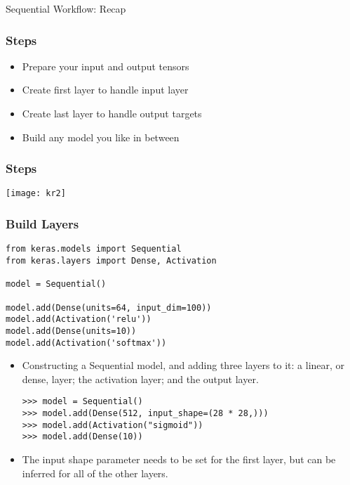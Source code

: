 \begin{frame}
  \begin{center}
    {\Large Sequential Workflow: Recap}
    
  \end{center}
\end{frame}
\begin{frame}[fragile] \frametitle{Steps}

\begin{itemize}
\item  Prepare your 
input and 
output tensors 
\item  Create first 
layer to handle 
input layer
\item  Create last 
layer to handle 
output targets
\item Build any 
model you like 
in between
\end{itemize}
\end{frame}

\begin{frame}[fragile] \frametitle{Steps}
\begin{center}
\texttt{[image: kr2]}
\end{center}
\end{frame}

\begin{frame}[fragile] \frametitle{Build Layers}
\begin{lstlisting}
from keras.models import Sequential
from keras.layers import Dense, Activation

model = Sequential()

model.add(Dense(units=64, input_dim=100))
model.add(Activation('relu'))
model.add(Dense(units=10))
model.add(Activation('softmax'))
\end{lstlisting}

\begin{itemize}
\item Constructing a Sequential model, and
adding three layers to it: a linear, or dense, layer;
the activation layer; and the output layer.
\begin{lstlisting}
>>> model = Sequential()
>>> model.add(Dense(512, input_shape=(28 * 28,)))
>>> model.add(Activation("sigmoid"))
>>> model.add(Dense(10))
\end{lstlisting}
\item The input shape parameter needs to be set for the
first layer, but can be inferred for all of the other
layers.
\end{itemize}
\end{frame}


